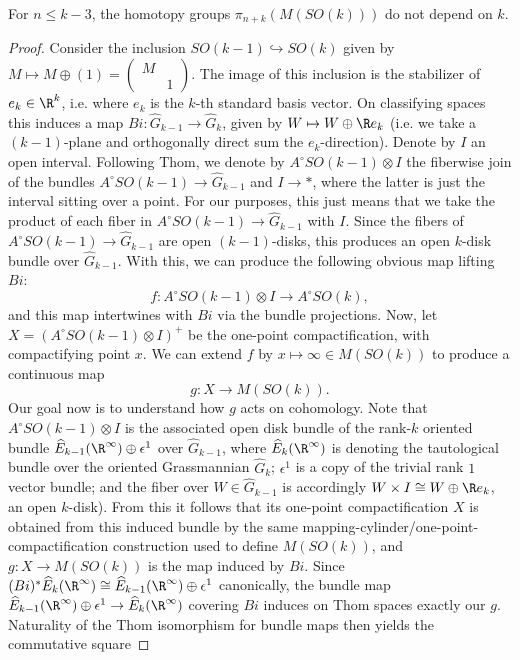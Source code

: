 \begin{theorem}
For $n\leq k-3$, the homotopy groups $\pi_{n+k}(M(SO(k)))$ do not depend on $k$.\end{theorem}
\begin{proof}
    Consider the inclusion $SO(k-1)\hookrightarrow SO(k)$ given by $M\mapsto M\oplus (1)=\begin{pmatrix}
        M&\\&1
    \end{pmatrix}$. The image of this inclusion is the stabilizer of $e_k\in \R^k$, i.e. where $e_k$ is the $k$-th standard basis vector. On classifying spaces this induces a map $Bi:\widehat G_{k-1}\to \widehat G_k$, given by $W\mapsto W\oplus \R e_k$ (i.e. we take a $(k-1)$-plane and orthogonally direct sum the $e_k$-direction). Denote by $I$ an open interval. Following Thom, we denote by $A^\circ SO(k-1)\otimes I$ the fiberwise join of the bundles $A^\circ SO(k-1)\to \widehat G_{k-1}$ and $I\to *$, where the latter is just the interval sitting over a point. For our purposes, this just means that we take the product of each fiber in $A^\circ SO(k-1)\to \widehat G_{k-1}$ with $I$. Since the fibers of $A^\circ SO(k-1)\to \widehat G_{k-1}$ are open $(k-1)$-disks, this produces an open $k$-disk bundle over $\widehat G_{k-1}$. With this, we can produce the following obvious map lifting $Bi$:
    \[
        f:A^\circ SO(k-1)\otimes I\to A^\circ SO(k),
    \]
    and this map intertwines with $Bi$ via the bundle projections. Now, let $X=(A^\circ SO(k-1)\otimes I)^+$ be the one-point compactification, with compactifying point $x$. We can extend $f$ by $x\mapsto \infty\in M(SO(k))$ to produce a continuous map
    \[
        g:X\to M(SO(k)).
    \]
    Our goal now is to understand how $g$ acts on cohomology. Note that $A^\circ SO(k-1)\otimes I$ is the associated open disk bundle of the rank-$k$ oriented bundle $\widehat E_{k-1}(\R^\infty)\oplus\epsilon^1$ over $\widehat G_{k-1}$, where $\widehat E_{k}(\R^\infty)$ is denoting the tautological bundle over the oriented Grassmannian $\widehat G_k$; $\epsilon^1$ is a copy of the trivial rank $1$ vector bundle; and the fiber over $W\in\widehat G_{k-1}$ is accordingly $W\times I\cong W\oplus \R e_k$, an open $k$-disk). From this it follows that its one-point compactification $X$ is obtained from this induced bundle by the same mapping-cylinder/one-point-compactification construction used to define $M(SO(k))$, and $g:X\to M(SO(k))$ is the map induced by $Bi$. Since $(Bi)^*\widehat E_k(\R^\infty)\cong\widehat E_{k-1}(\R^\infty)\oplus\epsilon^1$ canonically, the bundle map $\widehat E_{k-1}(\R^\infty)\oplus\epsilon^1\to\widehat E_k(\R^\infty)$ covering $Bi$ induces on Thom spaces exactly our $g$. Naturality of the Thom isomorphism for bundle maps then yields the commutative square

\end{proof}
